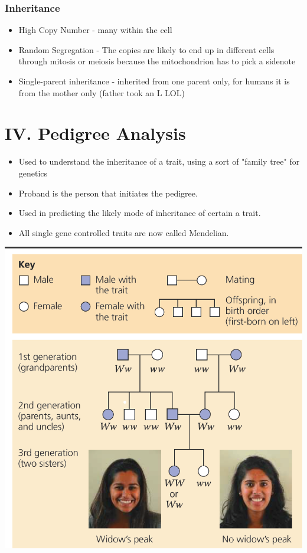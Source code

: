 \documentclass{article}
\begin{document}
\subsubsection*{Inheritance}
\begin{itemize}
    \item High Copy Number - many within the cell
    \item Random Segregation - The copies are likely to end up in different cells through mitosis or meiosis because the mitochondrion has to pick a sidenote
    \item Single-parent inheritance - inherited from one parent only, for humans it is from the mother only (father took an L LOL)
\end{itemize}
\section*{IV. Pedigree Analysis}
\begin{itemize}
    \item Used to understand the inheritance of a trait, using a sort of "family tree" for genetics
    \item Proband is the person that initiates the pedigree.
    \item Used in predicting the likely mode of inheritance of certain a trait.
    \item All single gene controlled traits are now called Mendelian.
\end{itemize}
\includegraphics*[scale=0.7]{pedigree.png}
\end{document}
